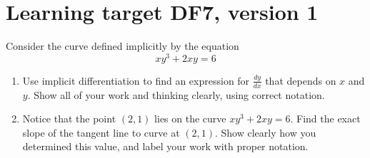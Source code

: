 
\usepackage{pgfplots}


%


\allowdisplaybreaks
\section{Learning target DF7, version 1}

Consider the curve defined implicitly by the equation
	$$xy^3 + 2xy = 6$$
	
	\begin{enumerate}[leftmargin=15pt]
	
		\item Use implicit differentiation to find an expression for $\frac{dy}{dx}$ that depends on $x$ and $y$.  Show all of your work and thinking clearly, using correct notation.

		\vfill
	
		
		\item Notice that the point $(2,1)$ lies on the curve $xy^3 + 2xy = 6$.  Find the exact slope of the tangent line to curve at $(2,1)$.  Show clearly how you determined this value, and label your work with proper notation.
		
		\vfill
	
	\end{enumerate}


